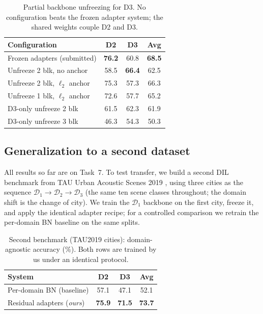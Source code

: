 \documentclass[9pt,conference]{IEEEtran}
\begin{document}
\begin{table}[t]
  \centering
  \caption{Partial backbone unfreezing for D3. No configuration beats the
           frozen adapter system; the shared weights couple D2 and D3.}
  \label{tab:unfreeze}
  \begin{tabularx}{\columnwidth}{Xccc}
    \toprule
    Configuration & D2 & D3 & Avg \\
    \midrule
    Frozen adapters (submitted)        & \textbf{76.2} & 60.8 & \textbf{68.5} \\
    Unfreeze 2 blk, no anchor          & 58.5 & \textbf{66.4} & 62.5 \\
    Unfreeze 2 blk, $\ell_2$ anchor    & 75.3 & 57.3 & 66.3 \\
    Unfreeze 1 blk, $\ell_2$ anchor    & 72.6 & 57.7 & 65.2 \\
    D3-only unfreeze 2 blk             & 61.5 & 62.3 & 61.9 \\
    D3-only unfreeze 3 blk             & 46.3 & 54.3 & 50.3 \\
    \bottomrule
  \end{tabularx}
\end{table}

\subsection{Generalization to a second dataset}
\label{ssec:tau}

All results so far are on Task~7. To test transfer, we build a second DIL
benchmark from TAU Urban Acoustic Scenes 2019 \cite{heittola2019tau}, using
three cities as the sequence $\mathcal{D}_1\!\rightarrow\!\mathcal{D}_2\!
\rightarrow\!\mathcal{D}_3$ (the same ten scene classes throughout; the
domain shift is the change of city). We train the $\mathcal{D}_1$ backbone
on the first city, freeze it, and apply the identical adapter recipe; for a
controlled comparison we retrain the per-domain BN baseline
\cite{mulimani2025dil} on the same splits.

\begin{table}[t]
  \centering
  \caption{Second benchmark (TAU2019 cities): domain-agnostic accuracy
           (\%). Both rows are trained by us under an identical protocol.}
  \label{tab:tau}
  \begin{tabularx}{\columnwidth}{Xccc}
    \toprule
    System & D2 & D3 & Avg \\
    \midrule
    Per-domain BN (baseline)        & 57.1 & 47.1 & 52.1 \\
    Residual adapters (\emph{ours}) & \textbf{75.9} & \textbf{71.5} & \textbf{73.7} \\
    \bottomrule
  \end{tabularx}
\end{table}
\end{document}
